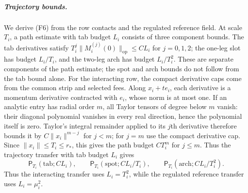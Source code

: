 \subparagraph{Trajectory bounds.}
We derive (F6) from the row contacts and the regulated reference field.
At scale $T_i$, a path estimate with tab budget $L_i$ consists of three
component bounds. The tab derivatives satisfy
$T_i^j\|M_i^{(j)}(0)\|_{\mathrm{op}}\leq C L_i$ for $j=0,1,2$; the
one-leg slot has budget $L_i/T_i$, and the two-leg arch has budget
$L_i/T_i^2$. These are separate components of the path estimate; the
spot and arch bounds do not follow from the tab bound alone. For the interacting row,
the compact derivative caps come from the common strip and selected
fees. Along $x_i+t e_i$, each derivative is a momentum derivative
contracted with $e_i$, whose norm is at most one. If an analytic entry
has radial order $m$, all Taylor tensors of degree below $m$ vanish:
their diagonal polynomial vanishes in every real direction, hence the
polynomial itself is zero. Taylor's integral remainder applied to its
$j$th derivative therefore bounds it by $C\|x_i\|^{m-j}$ for $j<m$;
for $j=m$ use the compact derivative cap. Since $\|x_i\|\leq T_i\leq
r_*$, this gives the path budget $C T_i^m$ for $j\leq m$. Thus the
trajectory transfer with tab budget $L_i$ gives
\begin{equation}
 \mathsf P_{T_i}(\text{tab};C L_i),\qquad
 \mathsf P_{T_i}(\text{spot};C L_i/T_i),\qquad
 \mathsf P_{T_i}(\text{arch};C L_i/T_i^2).
 \label{eq:annulus-fleet-face-estimates-display-F17}
\end{equation}
Thus the interacting transfer uses $L_i=T_i^2$, while the regulated
reference transfer uses $L_i=\mu_i^2$.

